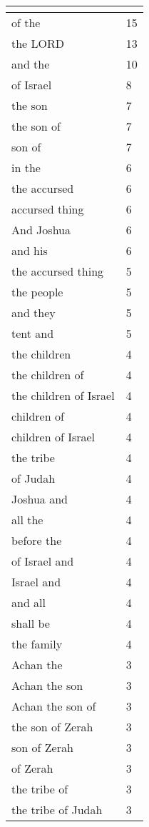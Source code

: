 \begin{center}
\begin{longtable}{|p{3.0in}|p{0.5in}|}
\hline \multicolumn{2}{c}{{ }} \\ \hline
\endfoot 
of the & 15\\ \hline 
the LORD & 13\\ \hline 
and the & 10\\ \hline 
of Israel & 8\\ \hline 
the son & 7\\ \hline 
the son of & 7\\ \hline 
son of & 7\\ \hline 
in the & 6\\ \hline 
the accursed & 6\\ \hline 
accursed thing & 6\\ \hline 
And Joshua & 6\\ \hline 
and his & 6\\ \hline 
the accursed thing & 5\\ \hline 
the people & 5\\ \hline 
and they & 5\\ \hline 
tent and & 5\\ \hline 
the children & 4\\ \hline 
the children of & 4\\ \hline 
the children of Israel & 4\\ \hline 
children of & 4\\ \hline 
children of Israel & 4\\ \hline 
the tribe & 4\\ \hline 
of Judah & 4\\ \hline 
Joshua and & 4\\ \hline 
all the & 4\\ \hline 
before the & 4\\ \hline 
of Israel and & 4\\ \hline 
Israel and & 4\\ \hline 
and all & 4\\ \hline 
shall be & 4\\ \hline 
the family & 4\\ \hline 
Achan the & 3\\ \hline 
Achan the son & 3\\ \hline 
Achan the son of & 3\\ \hline 
the son of Zerah & 3\\ \hline 
son of Zerah & 3\\ \hline 
of Zerah & 3\\ \hline 
the tribe of & 3\\ \hline 
the tribe of Judah & 3\\ \hline 

\end{longtable}
\end{center}
